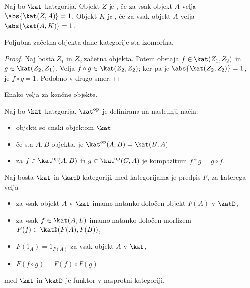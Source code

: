 \begin{definicija}
  Naj bo $\kat$ kategorija.
  Objekt $Z$ je , če za vsak objekt $A$ velja
  $\abs{\kat(Z,A)} = 1$.
  Objekt $K$ je , če za vsak objekt $A$ velja
  $\abs{\kat(A,K)} = 1$.
\end{definicija}

\begin{trditev}
  Poljubna začetna objekta dane kategorije sta izomorfna.
\end{trditev}

\begin{proof}
  Naj bosta $Z_1$ in $Z_2$ začetna objekta.
  Potem obstaja $f \in \kat(Z_1, Z_2)$ in $g \in \kat(Z_2, Z_1)$.
  Velja $f \circ g \in \kat(Z_2, Z_2)$; ker pa je $\abs{\kat(Z_2, Z_2)} = 1$, je
  $f \circ g = 1$.
  Podobno v drugo smer.
\end{proof}

\begin{opomba}
  Enako velja za končne objekte.
\end{opomba}


\begin{definicija}
  Naj bo $\kat$ kategorija.
   $\kat^{\text{op}}$ je definirana na naslednji
  način:
  \begin{itemize}
  \item objekti so enaki objektom $\kat$
  \item če sta $A, B$ objekta, je $\kat^{\text{op}}(A,B) = \kat(B,A)$
  \item za $f \in \kat^{\text{op}}(A,B)$ in $g \in \kat^{\text{op}}(C,A)$ je
	kompozitum $f * g = g \circ f$.
  \end{itemize}
\end{definicija}


\begin{definicija}
  Naj bosta $\kat$ in $\katD$ kategoriji.
   med kategorijama je predpis $F$, za katerega velja
  \begin{itemize}
  \item za vsak objekt $A$ v $\kat$ imamo natanko določen objekt $F(A)$ v
	$\katD$,
  \item za vsak $f \in \kat(A,B)$ imamo natanko določen morfizem $F(f) \in
	\katD(F(A), F(B))$,
  \item $F(1_A) = 1_{F(A)}$ za vsak objekt $A$ v $\kat$,
  \item $F(f \circ g) = F(f) \circ F(g)$
  \end{itemize}
   med $\kat$ in $\katD$ je funktor v nasprotni kategoriji.
\end{definicija}

